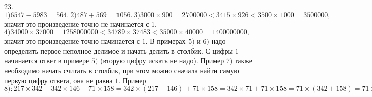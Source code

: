 23. $1) 6547-5983=564.\ 2) 487+569=\textbf{1}056.\ 3)3000\times900=2700000<3415\times926<3500\times1000=3500000,$ значит это произведение точно не начинается с 1.
$4) 34000\times37000=1258000000<34789\times37483<35000\times40000=1400000000,$ значит это произведение точно начинается с $1.$ В примерах $5)$ и $6)$ надо определить первое неполное делимое и начать делить в столбик. С цифры $1$ начинается ответ в примере $5)$ (вторую цифру искать не надо). Пример $7)$ также необходимо начать считать в столбик, при этом можно сначала найти самую первую цифру ответа, она не равна $1.$ Пример $8): 217\times342-342\times146+71\times158=342\times(217-146)+71\times158=342\times71+71\times158=71\times(342+158)=71\times500=35500.$\\
